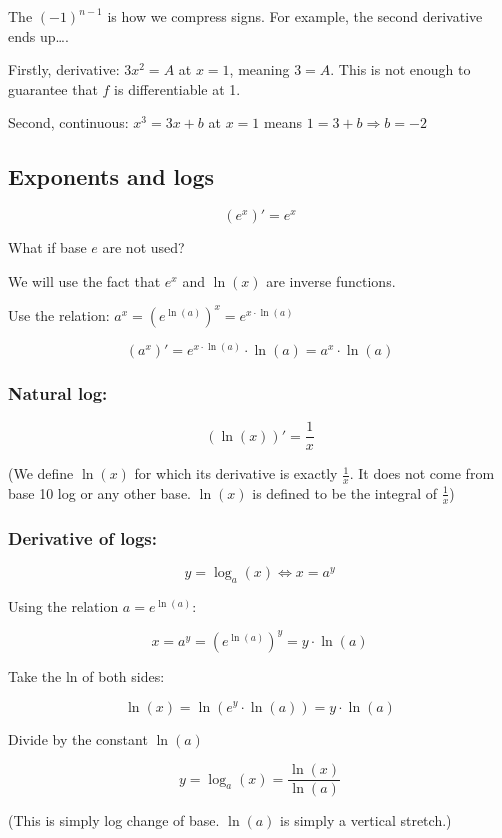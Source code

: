 \documentclass[12pt]{article}
\theoremstyle{plain}
\theoremstyle{remark}
\theoremstyle{definition}
\begin{document}
The \(( - 1)^{n - 1}\) is how we compress signs. For example, the second
derivative ends up\ldots.


Firstly, derivative: \(3x^{2} = A\) at \(x = 1\), meaning \(3 = A\).
This is not enough to guarantee that \(f\) is differentiable at 1.

Second, continuous: \(x^{3} = 3x + b\) at \(x = 1\) means
\(1 = 3 + b \Rightarrow b = - 2\)


\subsection{Exponents and logs}

\[\left( e^{x} \right)' = e^{x}\]

What if base \(e\) are not used?

We will use the fact that \(e^{x}\) and \(\ln(x)\) are inverse
functions.

Use the relation:
\(a^{x} = \left( e^{\ln(a)} \right)^{x} = e^{x \cdot \ln(a)}\)

\[\left( a^{x} \right)' = e^{x \cdot \ln(a)} \cdot \ln(a) = a^{x} \cdot \ln(a)\]


\subsubsection{Natural log:}

\[\left( \ln(x) \right)' = \frac{1}{x}\]

(We define \(\ln(x)\) for which its derivative is exactly
\(\frac{1}{x}\). It does not come from base 10 log or any other base.
\(\ln(x)\) is defined to be the integral of \(\frac{1}{x}\))


\subsubsection{Derivative of logs:}

\[y = \log_{a}{(x) \Leftrightarrow x = a^{y}}\]

Using the relation \(a = e^{\ln(a)}\):

\[x = a^{y} = \left( e^{\ln(a)} \right)^{y} = y \cdot \ln(a)\]

Take the ln of both sides:

\[\ln(x) = \ln\left( e^{y} \cdot \ln(a) \right) = y \cdot \ln(a)\]

Divide by the constant \(\ln(a)\)

\[y = \log_{a}(x) = \frac{\ln(x)}{\ln(a)}\]

(This is simply log change of base. \(\ln(a)\) is simply a vertical
stretch.)
\end{document}
